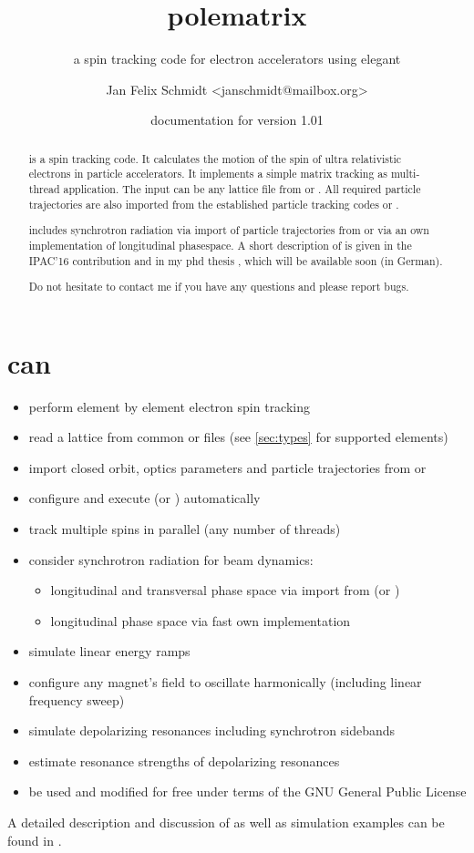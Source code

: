 \documentclass[a4paper]{scrartcl}
\author{Jan Felix Schmidt \textless janschmidt@mailbox.org\textgreater}
\title{polematrix}
\subtitle{a spin tracking code for electron accelerators using elegant}
\date{documentation for version 1.01}
\begin{document}
\maketitle

\begin{abstract}
  \polem is a spin tracking code. It calculates the motion of the spin of ultra
  relativistic electrons in particle accelerators. It implements a simple matrix tracking
  as multi-thread \cpp application. The input can be any lattice file from \ele or
  \madx. All required particle trajectories are also imported from the established
  particle tracking codes \ele or \madx.

  \polem includes synchrotron radiation via import of particle trajectories from \ele or
  via an own implementation of longitudinal phasespace. A short description of \polem is
  given in the IPAC'16 contribution \cite{IPAC16-decoh} and in my phd thesis \cite{dr},
  which will be available soon (in German).
  
  Do not hesitate to contact me if you have any questions and please report bugs.
\end{abstract}

\tableofcontents
\clearpage


\section{\polem can}
\label{sec:polem-can}

\begin{itemize}
\item perform element by element electron spin tracking
\item read a lattice from common \ele or \madx files (see \cref{sec:types} for supported elements)
\item import closed orbit, optics parameters and particle trajectories from \ele or
  \madx
\item configure and execute \ele (or \madx) automatically
\item track multiple spins in parallel (any number of threads)

\item consider synchrotron radiation for beam dynamics:
  \begin{itemize}
  \item longitudinal and transversal phase space via import from \ele (or \madx)
  \item longitudinal phase space via fast own implementation
  \end{itemize}
\item simulate linear energy ramps
\item configure any magnet's field to oscillate harmonically (including linear frequency sweep)
\item simulate depolarizing resonances including synchrotron sidebands
\item estimate resonance strengths of depolarizing resonances
\item be used and modified for free under terms of the GNU General Public License
\end{itemize}
A detailed description and discussion of \polem as well as simulation examples can be
found in \cite{dr}.
\end{document}
